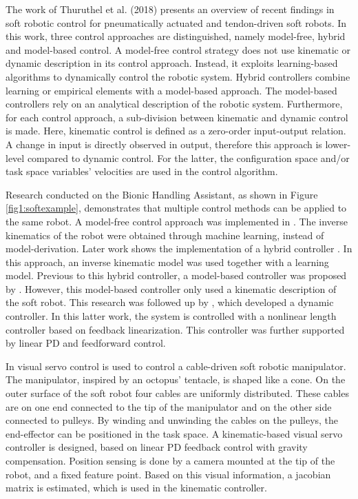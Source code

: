 The work of Thuruthel et al. (2018) \cite{george2018control} presents an overview of recent findings in soft robotic control for pneumatically actuated and tendon-driven soft robots. In this work, three control approaches are distinguished, namely model-free, hybrid and model-based control. A model-free control strategy does not use kinematic or dynamic description in its control approach. Instead, it exploits learning-based algorithms to dynamically control the robotic system. Hybrid controllers combine learning or empirical elements with a model-based approach. The model-based controllers rely on an analytical description of the robotic system. Furthermore, for each control approach, a sub-division between kinematic and dynamic control is made. Here, kinematic control is defined as a zero-order input-output relation. A change in input is directly observed in output, therefore this approach is lower-level compared to dynamic control. For the latter, the configuration space and/or task space variables' velocities are used in the control algorithm. 


Research conducted on the Bionic Handling Assistant, as shown in Figure \ref{fig1:softexample}, demonstrates that multiple control methods can be applied to the same robot. A model-free control approach was implemented in \cite{rolf2013efficient}. The inverse kinematics of the robot were obtained through machine learning, instead of model-derivation. Later work shows the implementation of a hybrid controller \cite{reinhart2017hybrid}. In this approach, an inverse kinematic model was used together with a learning model. Previous to this hybrid controller, a model-based controller was proposed by \cite{mahl2014bhakin}. However, this model-based controller only used a kinematic description of the soft robot. This research was followed up by \cite{falkenhahn2016dynamic}, which developed a dynamic controller. In this latter work, the system is controlled with a nonlinear length controller based on feedback linearization. This controller was further supported by linear PD and feedforward control. 

In \cite{wang2013visual} visual servo control is used to control a cable-driven soft robotic manipulator. The manipulator, inspired by an octopus' tentacle, is shaped like a cone. On the outer surface of the soft robot four cables are uniformly distributed. These cables are on one end connected to the tip of the manipulator and on the other side connected to pulleys. By winding and unwinding the cables on the pulleys, the end-effector can be positioned in the task space. A kinematic-based visual servo controller is designed, based on linear PD feedback control with gravity compensation. Position sensing is done by a camera mounted at the tip of the robot, and a fixed feature point. Based on this visual information, a jacobian matrix is estimated, which is used in the kinematic controller.

